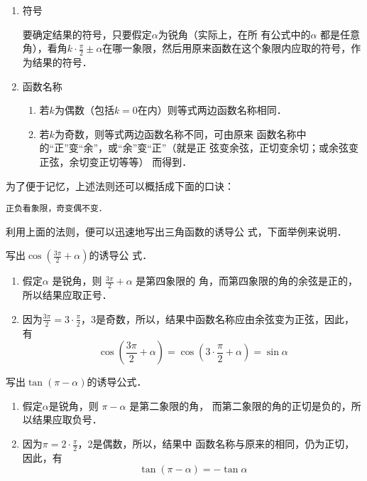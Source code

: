 \begin{enumerate}
    \item 符号
    
要确定结果的符号，只要假定$\alpha$为锐角（实际上，在所
有公式中的$\alpha$ 都是任意角），看角$k\cdot \frac{\pi}{2}\pm \alpha$在哪一象限，然后用原来函数在这个象限内应取的符号，作为结果的符号．

\item 函数名称
\begin{enumerate}
    \item 若$k$为偶数（包括$k=0$在内）则等式两边函数名称相同．
    \item 若$k$为奇数，则等式两边函数名称不同，可由原来
函数名称中的“正”变“余”，或“余”变“正”（就是正
弦变余弦，正切变余切；或余弦变正弦，余切变正切等等）
而得到．
\end{enumerate}
\end{enumerate}

为了便于记忆，上述法则还可以概括成下面的口诀：
\begin{center}
\verb|正负看象限，奇变偶不变． |
\end{center}

利用上面的法则，便可以迅速地写出三角函数的诱导公
式，下面举例来说明．

\begin{example}
    写出$\cos\left(\frac{3\pi}{2}+\alpha\right)$的诱导公
    式．
\end{example}

\begin{solution}
\begin{enumerate}
    \item 假定$\alpha$ 是锐角，则
$\frac{3\pi}{2}+\alpha$ 是第四象限的
角，而第四象限的角的余弦是正的，所以结果应取正号．
\item 因为$\frac{3\pi}{2}=3\cdot \frac{\pi}{2}$，3是奇数，所以，结果中函数名称应由余弦变为正弦，因此，有
\[\cos\left(\frac{3\pi}{2}+\alpha\right)=\cos\left(3\cdot \frac{\pi}{2}+\alpha\right)=\sin\alpha\]
\end{enumerate}
\end{solution}

\begin{example}
    写出$\tan(\pi-\alpha)$的诱导公式．
\end{example}

\begin{solution}
\begin{enumerate}
    \item 假定$\alpha$是锐角，则
$\pi -\alpha$ 是第二象限的角，
而第二象限的角的正切是负的，所以结果应取负号．
\item 因为$\pi =2\cdot\frac{\pi}{2}$，2是偶数，所以，结果中
函数名称与原来的相同，仍为正切，因此，有
\[\tan(\pi -\alpha )=-\tan\alpha \]
\end{enumerate}
\end{solution}

